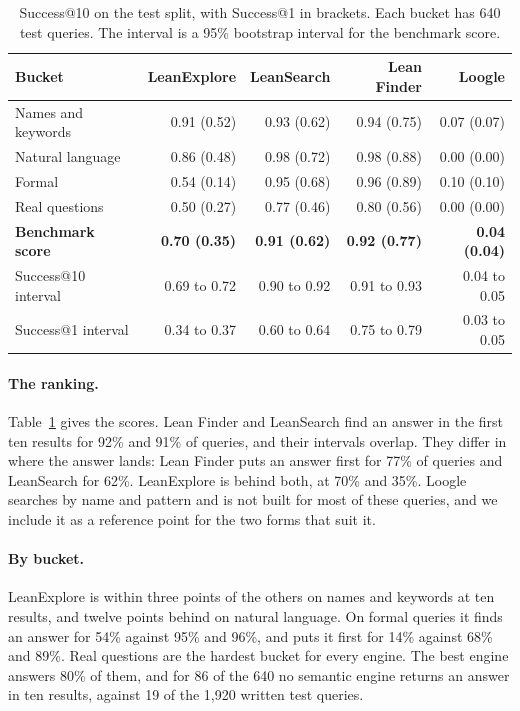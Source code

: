 \documentclass{article}
\newcommand{\thead}[1]{\textbf{#1}}
\newcommand{\rowrule}{\arrayrulecolor{nBorderLight}\specialrule{0.4pt}{3pt}{3pt}\arrayrulecolor{nBorder}}
\begin{document}
\begin{table}[t]
\centering\small
\caption{Success@10 on the test split, with Success@1 in brackets. Each bucket
has 640 test queries. The interval is a 95\% bootstrap interval for the
benchmark score.}
\label{tab:results}
\begin{tabular}{@{}lrrrr@{}}
\toprule
\thead{Bucket} & \thead{LeanExplore} & \thead{LeanSearch} & \thead{Lean Finder} & \thead{Loogle} \\
\midrule
Names and keywords & 0.91 (0.52) & 0.93 (0.62) & 0.94 (0.75) & 0.07 (0.07) \\
\rowrule
Natural language & 0.86 (0.48) & 0.98 (0.72) & 0.98 (0.88) & 0.00 (0.00) \\
\rowrule
Formal & 0.54 (0.14) & 0.95 (0.68) & 0.96 (0.89) & 0.10 (0.10) \\
\rowrule
Real questions & 0.50 (0.27) & 0.77 (0.46) & 0.80 (0.56) & 0.00 (0.00) \\
\midrule
\textbf{Benchmark score} & \textbf{0.70 (0.35)} & \textbf{0.91 (0.62)} & \textbf{0.92 (0.77)} & \textbf{0.04 (0.04)} \\
Success@10 interval & 0.69 to 0.72 & 0.90 to 0.92 & 0.91 to 0.93 & 0.04 to 0.05 \\
Success@1 interval & 0.34 to 0.37 & 0.60 to 0.64 & 0.75 to 0.79 & 0.03 to 0.05 \\
\bottomrule
\end{tabular}
\end{table}

\paragraph{The ranking.} Table~\ref{tab:results} gives the scores. Lean
Finder and LeanSearch find an answer in the first ten results for 92\% and
91\% of queries, and their intervals overlap. They differ in where the answer
lands: Lean Finder puts an answer first for 77\% of queries and LeanSearch for
62\%. LeanExplore is behind both, at 70\% and 35\%. Loogle searches by name and
pattern and is not built for most of these queries, and we include it as a
reference point for the two forms that suit it.

\paragraph{By bucket.} LeanExplore is within three points of the others on
names and keywords at ten results, and twelve points behind on natural
language. On formal queries it finds an answer for 54\% against 95\% and 96\%,
and puts it first for 14\% against 68\% and 89\%. Real questions are the
hardest bucket for every engine. The best engine answers 80\% of them, and for
86 of the 640 no semantic engine returns an answer in ten results, against 19
of the 1,920 written test queries.
\end{document}

